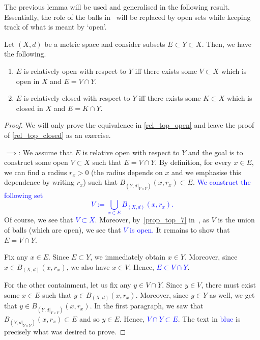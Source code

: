 The previous lemma will be used and generalised in the following result. Essentially, the role of the balls in~ will be replaced by open sets while keeping track of what is meant by `open'.
\begin{prop}
\label{prop:rel_top}
Let $(X,d)$ be a metric space and consider subsets $E\subset Y \subset X$. Then, we have the following.
\begin{enumerate}
	\item \label{rel_top_open} $E$ is relatively open with respect to $Y$ iff there exists some $V \subset X$ which is open in $X$ and $E = V \cap Y$.
	\item \label{rel_top_closed} $E$ is relatively closed with respect to $Y$ iff there exists some $K\subset X$ which is closed in $X$ and $E = K \cap Y$.
\end{enumerate}
\begin{proof}
	We will only prove the equivalence in \ref{rel_top_open} and leave the proof of \ref{rel_top_closed} as an exercise.
	
	$\implies$: We assume that $E$ is relative open with respect to $Y$ and the goal is to construct some open $V \subset X$ such that $E = V \cap Y$. By definition, for every $x\in E$, we can find a radius $r_x>0$ (the radius depends on $x$ and we emphasise this dependence by writing $r_x$) such that $B_{(Y,d|_{Y\times Y})}(x,r_x) \subset E$. \textcolor{blue}{We construct the following set
	\[
	V := \bigcup_{x\in E} B_{(X,d)}(x,r_x).
	\]
	} Of course, we see that \textcolor{blue}{$V \subset X$}. Moreover, by~\ref{prop_top_7} in~, as $V$ is the union of balls (which are open), we see that \textcolor{blue}{$V$ is open.} It remains to show that $E = V \cap Y$.
	
	Fix any $x\in E$. Since $E\subset Y$, we immediately obtain $x\in Y$. Moreover, since $x \in B_{(X,d)}(x,r_x)$, we also have $x\in V$. Hence, \textcolor{blue}{$E\subset V\cap Y$}.
	
	For the other containment, let us fix any $y \in V \cap Y$. Since $y \in V$, there must exist some $x\in E$ such that $y\in B_{(X,d)}(x,r_x)$. Moreover, since $y \in Y$ as well, we get that $y \in B_{(Y,d|_{Y\times Y})}(x,r_x)$. In the first paragraph, we saw that $B_{(Y,d|_{Y\times Y})}(x,r_x) \subset E$ and so $y \in E$. Hence, \textcolor{blue}{$V\cap Y \subset E$}. The text in \textcolor{blue}{blue} is precisely what was desired to prove.
	

\end{proof}
\end{prop}
